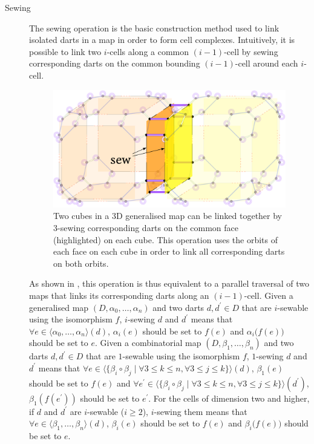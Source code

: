 \begin{description}
\item[Sewing]
The sewing operation is the basic construction method used to link isolated darts in a map in order to form cell complexes.
Intuitively, it is possible to link two $i$-cells along a common $(i-1)$-cell by sewing corresponding darts on the common bounding $(i-1)$-cell around each $i$-cell.
\begin{figure}[tbp]
\centering
\includegraphics[width=\linewidth]{figs/3-sew}
\caption[3-sewing two cubes]{Two cubes in a 3D generalised map can be linked together by 3-sewing corresponding darts on the common face (highlighted) on each cube.
This operation uses the orbits of each face on each cube in order to link all corresponding darts on both orbits.}
\label{fig:3-sew}
\end{figure}
As shown in , this operation is thus equivalent to a parallel traversal of two maps that links its corresponding darts along an $(i-1)$-cell.
Given a generalised map $(D,\alpha_{0},\ldots,\alpha_{n})$ and two darts $d,d^\prime \in D$ that are $i$-sewable using the isomorphism $f$, $i$-sewing $d$ and $d^\prime$ means that $\forall e \in \langle\alpha_0, \ldots, \alpha_n\rangle(d)$, $\alpha_i(e)$ should be set to $f(e)$ and $\alpha_i\big(f(e)\big)$ should be set to $e$.
Given a combinatorial map $(D, \beta_{1}, \ldots, \beta_{n})$ and two darts $d,d^\prime \in D$ that are $1$-sewable using the isomorphism $f$, $1$-sewing $d$ and $d^\prime$ means that $\forall e \in \langle \{\beta_i\circ \beta_j \mid \forall 3 \leq k \leq n, \forall 3 \leq j \leq k\} \rangle(d)$, $\beta_1(e)$ should be set to $f(e)$ and $\forall e^\prime \in \langle \{\beta_i\circ \beta_j \mid \forall 3 \leq k \leq n, \forall 3 \leq j \leq k\} \rangle(d^\prime)$, $\beta_1(f(e^\prime))$ should be set to $e^\prime$.
For the cells of dimension two and higher, if $d$ and $d^\prime$ are $i$-sewable ($i \geq 2$), $i$-sewing them means that $\forall e \in \langle\beta_{1}, \ldots, \beta_{n}\rangle(d)$, $\beta_i(e)$ should be set to $f(e)$ and $\beta_i\big(f(e)\big)$ should be set to $e$.

\end{description}

